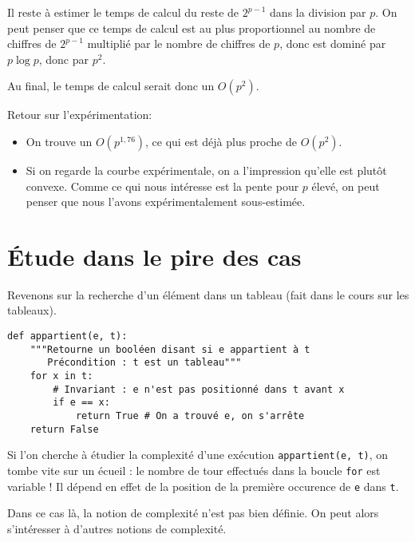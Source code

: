 Il reste à estimer le temps de calcul du reste de $2^{p-1}$ dans la
division par $p$. On peut penser que ce temps de calcul est au plus
proportionnel au nombre de chiffres de $2^{p-1}$ multiplié par le
nombre de chiffres de $p$, donc est dominé par $p\log p$, donc par
$p^{2}$.

Au final, le temps de calcul serait donc un $O(p^{2})$.

Retour sur l'expérimentation:
\begin{itemize}
\item[\textbullet] On trouve un $O(p^{1,76})$, ce qui est déjà plus proche de $O(p^{2})$.
\item[\textbullet] Si on regarde la courbe expérimentale, on a l'impression qu'elle
  est plutôt convexe. Comme ce qui nous intéresse est la pente pour
  $p$ élevé, on peut penser que nous l'avons expérimentalement sous-estimée.
\end{itemize}

\section{\'Etude dans le pire des cas}

Revenons sur la recherche d'un élément dans un tableau (fait dans le cours sur les tableaux). 

\begin{lstlisting}
def appartient(e, t):
    """Retourne un booléen disant si e appartient à t
       Précondition : t est un tableau"""
    for x in t:
        # Invariant : e n'est pas positionné dans t avant x
        if e == x:
            return True # On a trouvé e, on s'arrête
    return False
\end{lstlisting}

Si l'on cherche à étudier la complexité d'une exécution \texttt{appartient(e, t)}, on tombe vite sur un écueil : le nombre de tour effectués dans la boucle \texttt{for} est variable ! 
Il dépend en effet de la position de la première occurence de \texttt{e} dans \texttt{t}. 

Dans ce cas là, la notion de complexité n'est pas bien définie. On peut alors s'intéresser à d'autres notions de complexité. 

